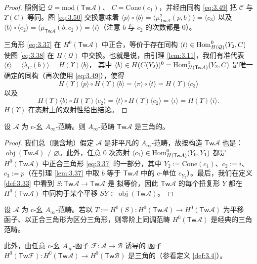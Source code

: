 \begin{proof}
照例记 $\mathcal Q=\mathrm{mod}(\mathsf{Tw}\mathcal A)$、
$C=\mathrm{Cone}(c_1)$，并经由同构 \eqref{eq:3.49} 把 $\mathcal C$ 与
$\Upsilon(C)$ 等同。图 \eqref{eq:3.50} 交换意味着
$\langle p\rangle\circ\langle b\rangle=
\langle\mu^2_{\mathsf{Tw}\mathcal A}(p,b)\rangle=\langle c_3\rangle$ 以及
$\langle b\rangle\circ\langle c_2\rangle=
\langle\mu_{\mathsf{Tw}\mathcal A}(b,c_2)\rangle=\langle i\rangle$（注意 $b$
与 $c_2$ 的次数都是 0）。

三角形 \eqref{eq:3.37} 在 $H^0(\mathsf{Tw}\mathcal A)$ 中正合，等价于存在同构
$\langle t\rangle\in\operatorname{Hom}^0_{H(\mathcal Q)}(Y_2,C)$ 使图 \eqref{eq:3.38} 在
$H(\mathcal Q)$ 中交换。也就是说，由引理 \ref{lem:3.11}，我们有准代表
$\langle t\rangle=\langle\lambda_C(b)\rangle=H(\Upsilon)\langle b\rangle$，
其中 $\langle b\rangle\in H(C(Y_2))^0=\operatorname{Hom}^0_{H(\mathsf{Tw}\mathcal A)}
(Y_2,C)$ 是唯一确定的同构（再次使用 \eqref{eq:3.49}），使得
\[
  H(\Upsilon)\langle p\rangle\circ H(\Upsilon)\langle b\rangle=
  \langle\pi\rangle\circ\langle t\rangle=H(\Upsilon)\langle c_3\rangle
\]
以及
\[
  H(\Upsilon)\langle b\rangle\circ H(\Upsilon)\langle c_2\rangle=
  \langle t\rangle\circ H(\Upsilon)\langle c_2\rangle=\langle\iota\rangle=
  H(\Upsilon)\langle i\rangle.
\]
$H(\Upsilon)$ 在态射上的双射性给出结论。
\end{proof}

\begin{Cor}\label{cor:3.38}
设 $\mathcal A$ 为 c-幺 $A_\infty$-范畴。则 $A_\infty$-范畴
$\mathsf{Tw}\mathcal A$ 是三角的。
\end{Cor}

\begin{proof}
我们总（隐含地）假定 $\mathcal A$ 是非平凡的 $A_\infty$-范畴，故按构造
$\mathsf{Tw}\mathcal A$ 也是：$\operatorname{obj}(\mathsf{Tw}\mathcal A)
\neq\varnothing$。此外，任意 0 次态射
$\langle c_1\rangle\in\operatorname{Hom}^0_{H(\mathsf{Tw}\mathcal A)}(Y_0,Y_1)$ 都是
$H^0(\mathsf{Tw}\mathcal A)$ 中正合三角形 \eqref{eq:3.37} 的一部分，其中
$Y_2:=\mathrm{Cone}(c_1)$、$c_2:=i$、$c_3:=p$（在引理 \ref{lem:3.37} 中取
$b$ 等于 $\mathsf{Tw}\mathcal A$ 中的 c-单位 $e_{Y_2}$）。最后，我们在定义
\ref{def:3.33} 中看到 $S:\mathsf{Tw}\mathcal A\to\mathsf{Tw}\mathcal A$ 是
拟等价，因此 $\mathsf{Tw}\mathcal A$ 的每个扭复形 $Y$ 都在
$H^0(\mathsf{Tw}\mathcal A)$ 中同构于某个平移
$S\tilde Y\in\operatorname{obj}(\mathsf{Tw}\mathcal A)$。
\end{proof}

\begin{Pro}\label{pro:3.39}
设 $\mathcal A$ 为 c-幺 $A_\infty$-范畴。若以
$T:=H^0(S):H^0(\mathsf{Tw}\mathcal A)\to H^0(\mathsf{Tw}\mathcal A)$ 为平移
函子、以正合三角形为区分三角形，则零阶上同调范畴
$H^0(\mathsf{Tw}\mathcal A)$ 是经典的三角范畴。

此外，由任意 c-幺 $A_\infty$-函子 $\mathcal F:\mathcal A\to\mathcal B$ 诱导的
函子 $H^0(\mathsf{Tw}\mathcal F):H^0(\mathsf{Tw}\mathcal A)\to
H^0(\mathsf{Tw}\mathcal B)$ 是三角的（参看定义 \ref{def:3.4}）。
\end{Pro}

